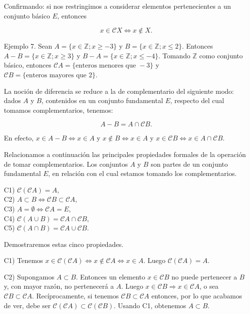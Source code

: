 Confirmando: si nos restringimos a considerar elementos pertenecientes a un conjunto básico \(E\), entonces

\[
x \in \mathcal{C}X \iff x \notin X.
\]

Ejemplo 7. Sean \( A = \{x \in \mathbb{Z}; x \geq -3\} \) y \( B = \{x \in \mathbb{Z}; x \leq 2\} \). Entonces \( A - B = \{x \in \mathbb{Z}; x \geq 3\} \) y \( B - A = \{x \in \mathbb{Z}; x \leq -4\} \). Tomando \(\mathbb{Z}\) como conjunto básico, entonces \( \mathcal{C}A = \{\text{enteros menores que } -3\} \) y \( \mathcal{C}B = \{\text{enteros mayores que } 2\} \).

La noción de diferencia se reduce a la de complementario del siguiente modo: dados \( A \) y \( B \), contenidos en un conjunto fundamental \( E \), respecto del cual tomamos complementarios, tenemos:

\[
A - B = A \cap \mathcal{C}B.
\]

En efecto, \( x \in A - B \Leftrightarrow x \in A \) y \( x \notin B \Leftrightarrow x \in A \) y \( x \in \mathcal{C}B \Leftrightarrow x \in A \cap \mathcal{C}B \).

Relacionamos a continuación las principales propiedades formales de la operación de tomar complementarios. Los conjuntos \( A \) y \( B \) son partes de un conjunto fundamental \( E \), en relación con el cual estamos tomando los complementarios.

C1) \( \mathcal{C}(\mathcal{C}A) = A \),\\
C2) \( A \subset B \Leftrightarrow \mathcal{C}B \subset \mathcal{C}A \),\\
C3) \( A = \emptyset \Leftrightarrow \mathcal{C}A = E \),\\
C4) \( \mathcal{C}(A \cup B) = \mathcal{C}A \cap \mathcal{C}B \),\\
C5) \( \mathcal{C}(A \cap B) = \mathcal{C}A \cup \mathcal{C}B \).

Demostraremos estas cinco propiedades.

C1) Tenemos \( x \in \mathcal{C}(\mathcal{C}A) \Leftrightarrow x \notin \mathcal{C}A \Leftrightarrow x \in A \). Luego \( \mathcal{C}(\mathcal{C}A) = A \).

C2) Supongamos \( A \subset B \). Entonces un elemento \( x \in \mathcal{C}B \) no puede pertenecer a \( B \) y, con mayor razón, no pertenecerá a \( A \). Luego \( x \in \mathcal{C}B \Rightarrow x \in \mathcal{C}A \), o sea \( \mathcal{C}B \subset \mathcal{C}A \). Recíprocamente, si tenemos \( \mathcal{C}B \subset \mathcal{C}A \) entonces, por lo que acabamos de ver, debe ser \( \mathcal{C}(\mathcal{C}A) \subset \mathcal{C}(\mathcal{C}B) \). Usando C1, obtenemos \( A \subset B \).

